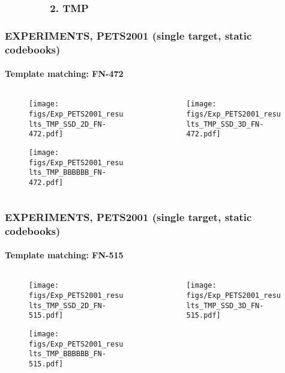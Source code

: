 \subsubsection{\ \ \ \ \ \ \ \ 2. TMP}
\begin{frame}
\frametitle{\small EXPERIMENTS, PETS2001 (single target, static codebooks)}
\framesubtitle{Template matching: FN-472}
	\begin{changemargin}{-1.35in}{0in}
	\begin{columns}
		\begin{column}{1.5in}			
			\begin{figure}
				\texttt{[image: figs/Exp\_PETS2001\_results\_TMP\_SSD\_2D\_FN-472.pdf]}
			\end{figure}
			\begin{figure}
				\texttt{[image: figs/Exp\_PETS2001\_results\_TMP\_BBBBBB\_FN-472.pdf]}
			\end{figure}
		\end{column}
		\begin{column}{1.5in}
			\begin{figure}
				\texttt{[image: figs/Exp\_PETS2001\_results\_TMP\_SSD\_3D\_FN-472.pdf]}
			\end{figure}
		\end{column}
	\end{columns}
	\end{changemargin}
\end{frame}


\begin{frame}
\frametitle{\small EXPERIMENTS, PETS2001 (single target, static codebooks)}
\framesubtitle{Template matching: FN-515}
	\begin{changemargin}{-1.35in}{0in}
	\begin{columns}
		\begin{column}{1.5in}			
			\begin{figure}
				\texttt{[image: figs/Exp\_PETS2001\_results\_TMP\_SSD\_2D\_FN-515.pdf]}
			\end{figure}
			\begin{figure}
				\texttt{[image: figs/Exp\_PETS2001\_results\_TMP\_BBBBBB\_FN-515.pdf]}
			\end{figure}
		\end{column}
		\begin{column}{1.5in}
			\begin{figure}
				\texttt{[image: figs/Exp\_PETS2001\_results\_TMP\_SSD\_3D\_FN-515.pdf]}
			\end{figure}
		\end{column}
	\end{columns}
	\end{changemargin}
\end{frame}




